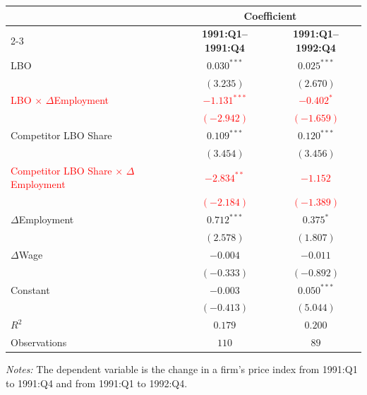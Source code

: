 \begin{minipage}{\textwidth}
    \centering
    \scriptsize
    \renewcommand{\arraystretch}{0.92}
    \begin{tabular}{@{}lcc@{}}
        \toprule
        & \multicolumn{2}{c}{\textbf{Coefficient}} \\
        \cmidrule(lr){2-3}
        
            & \textbf{1991:Q1--1991:Q4}
            & \textbf{1991:Q1--1992:Q4} \\
        \midrule
        LBO
            & $0.030^{***}$ & $0.025^{***}$ \\
            & $(3.235)$ & $(2.670)$ \\
        \textcolor{red}{LBO $\times$ $\Delta$Employment}
            & \textcolor{red}{$-1.131^{***}$} & \textcolor{red}{$-0.402^{*}$} \\
            & \textcolor{red}{$(-2.942)$} & \textcolor{red}{$(-1.659)$} \\
        Competitor LBO Share
            & $0.109^{***}$ & $0.120^{***}$ \\
            & $(3.454)$ & $(3.456)$ \\
        \textcolor{red}{Competitor LBO Share $\times$ $\Delta$Employment}
            & \textcolor{red}{$-2.834^{**}$} & \textcolor{red}{$-1.152$} \\
            & \textcolor{red}{$(-2.184)$} & \textcolor{red}{$(-1.389)$} \\
        $\Delta$Employment
            & $0.712^{***}$ & $0.375^{*}$ \\
            & $(2.578)$ & $(1.807)$ \\
        $\Delta$Wage
            & $-0.004$ & $-0.011$ \\
            & $(-0.333)$ & $(-0.892)$ \\
        Constant
            & $-0.003$ & $0.050^{***}$ \\
            & $(-0.413)$ & $(5.044)$ \\
        \midrule
        $R^2$ & $0.179$ & $0.200$ \\
        Observations & $110$ & $89$ \\
        \bottomrule
    \end{tabular}

    \vspace{0.1cm}
    \centering
    \footnotesize
    \textit{Notes:} The dependent variable is the change in a firm's price index
    from 1991:Q1 to 1991:Q4 and from 1991:Q1 to 1992:Q4.
\end{minipage}
